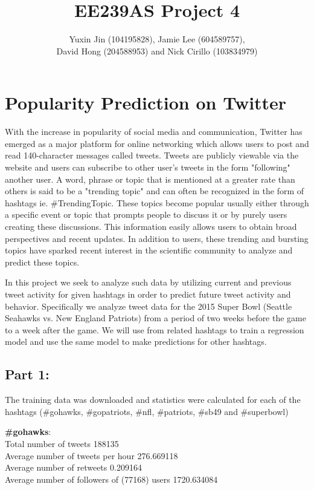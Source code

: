 \documentclass[12pt]{article}
\begin{document}
\title{\textbf{EE239AS Project 4}}

\author{Yuxin Jin (104195828), Jamie Lee (604589757),\\ David Hong (204588953) and Nick Cirillo (103834979)}

\maketitle

\section{Popularity Prediction on Twitter}

With the increase in popularity of social media and communication, Twitter has emerged as a major platform for online networking which allows users to post and read 140-character messages called tweets. Tweets are publicly viewable via the website and users can subscribe to other user's tweets in the form "following" another user. A word, phrase or topic that is mentioned at a greater rate than others is said to be a "trending topic" and can often be recognized in the form of hashtags ie. \#TrendingTopic. These topics  become popular usually either through a specific event or topic that prompts people to discuss it or by purely users creating these discussions. This information easily allows users to obtain broad perspectives and recent updates. In addition to users, these trending and bursting topics have sparked recent interest in the scientific community to analyze and predict these topics.

In this project we seek to analyze such data by utilizing current and previous tweet activity for given hashtags in order to predict future tweet activity and behavior. Specifically we analyze tweet data for the 2015 Super Bowl (Seattle Seahawks vs. New England Patriots) from a period of two weeks before the game to a week after the game. We will use from related hashtags to train a regression model and use the same model to make predictions for other hashtags.


\subsection{Part 1:}

The training data was downloaded and statistics were calculated for each of the hashtags (\#gohawks, \#gopatriots, \#nfl, \#patriots, \#sb49 and \#superbowl)

\textbf{\#gohawks}: \\
Total number of tweets 188135 \\
Average number of tweets per hour 276.669118 \\
Average number of retweets 0.209164 \\
Average number of followers of (77168) users 1720.634084 \\
\end{document}
